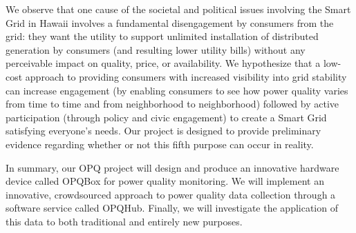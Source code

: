 We observe that one cause of the societal and political issues involving the Smart Grid in Hawaii involves a fundamental disengagement by consumers from the grid: they want the utility to support unlimited installation of distributed generation by consumers (and resulting lower utility bills) without any perceivable impact on quality, price, or availability.  We hypothesize that a low-cost approach to providing consumers with increased visibility into grid stability can increase engagement (by enabling consumers to see how power quality varies from time to time and from neighborhood to neighborhood) followed by active participation (through policy and civic engagement) to create a Smart Grid satisfying everyone's needs.  Our project is designed to provide preliminary evidence regarding whether or not this fifth purpose can occur in reality.

In summary, our OPQ project will design and produce an innovative hardware device called OPQBox for power quality monitoring. We will implement an innovative, crowdsourced approach to power quality data collection through a software service called OPQHub. Finally, we will investigate the application of this data to both traditional and entirely new purposes.   